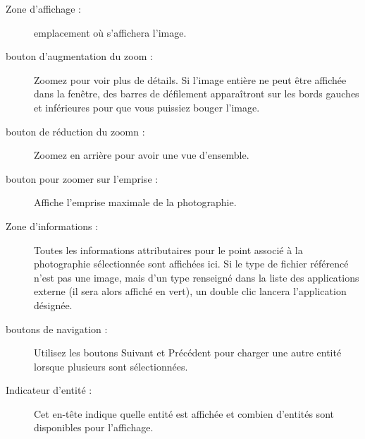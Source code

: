 
\begin{description}
\item[Zone d'affichage :] emplacement où s'affichera l'image.
\item[bouton d'augmentation du zoom :] Zoomez pour voir plus de détails. Si l'image entière ne peut être affichée dans la fenêtre, des barres de défilement apparaîtront sur les bords gauches et inférieures pour que vous puissiez bouger l'image.
\item[bouton de réduction du zoomn :] Zoomez en arrière pour avoir une vue d'ensemble.
\item[bouton pour zoomer sur l'emprise :] Affiche l'emprise maximale de la photographie.
\item[Zone d'informations :] Toutes les informations attributaires pour le point associé à la photographie sélectionnée sont affichées ici. Si le type de fichier référencé n'est pas une image, mais d'un type renseigné dans la liste des applications externe (il sera alors affiché en vert), un double clic lancera l'application désignée.
\item[boutons de navigation :] Utilisez les boutons Suivant et Précédent pour charger une autre entité lorsque  plusieurs sont sélectionnées.
\item[Indicateur d'entité :] Cet en-tête indique quelle entité est affichée et combien d'entités sont disponibles pour l'affichage.
\end{description}

